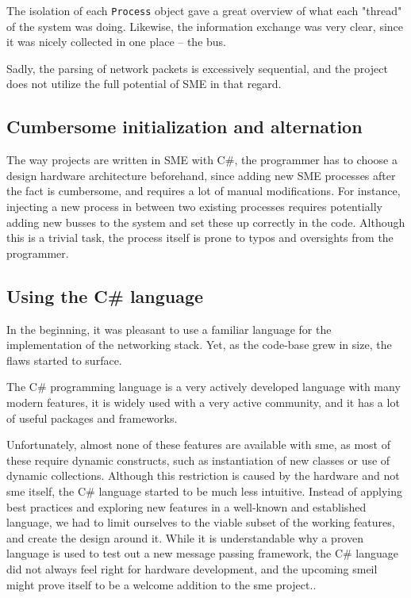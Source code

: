 The isolation of each \texttt{Process} object gave a great overview of what each
"thread" of the system was doing. Likewise, the information exchange was very
clear, since it was nicely collected in one place -- the bus.

Sadly, the parsing of network packets is excessively sequential, and the
project does not utilize the full potential of SME in that regard.

\subsection{Cumbersome initialization and alternation}
The way projects are written in SME with C\#, the programmer has to
choose a design hardware architecture beforehand, since adding new SME
processes after the fact is cumbersome, and requires a lot of manual
modifications.
For instance, injecting a new process in between two existing processes
requires potentially adding new busses to the system and set these up correctly
in the code. Although this is a trivial task, the process itself is prone to
typos and oversights from the programmer.


\subsection{Using the C\# language}
In the beginning, it was pleasant to use a familiar language for the
implementation of the networking stack. Yet, as the code-base grew in size, the
flaws started to surface.

The C\# programming language is a very actively developed language with many
modern features, it is widely used with a very active community, and it has a lot
of useful packages and frameworks.

Unfortunately, almost none of these features are available with \gls{sme},
as most of these require dynamic constructs, such as instantiation of new
classes or use of dynamic collections. Although this restriction is caused
by the hardware and not \gls{sme} itself, the C\# language started to be
much less intuitive. Instead of applying best practices and exploring new
features in a well-known and established language, we had to limit ourselves
to the viable subset of the working features, and create the design around
it. While it is understandable why a proven language is used to test out a
new message passing framework, the C\# language did not always feel right
for hardware development, and the upcoming \gls{smeil} might prove itself
to be a welcome addition to the \gls{sme} project.\cite{github_smeil}.


